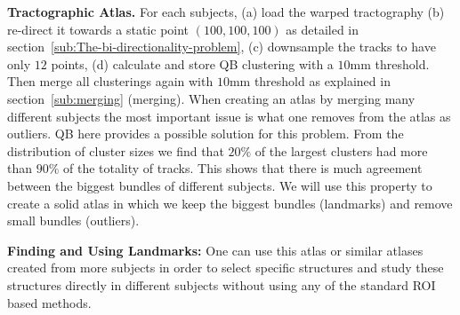 \documentclass[preprint,authoryear,a4paper,10pt,onecolumn]{elsarticle}
\begin{document}
\textbf{Tractographic Atlas.} For each subjects, (a) load the warped
tractography (b) re-direct it towards a static point $(100,100,100)$ as
detailed in section~\ref{sub:The-bi-directionality-problem}, (c)
downsample the tracks to have only $12$ points, (d) calculate and store
QB clustering with a $10$mm threshold. Then merge all clusterings again
with $10$mm threshold as explained in section~\ref{sub:merging}
(merging). When creating an atlas by merging many different subjects
the most important issue is what one removes from the atlas as
outliers. QB here provides a possible solution for this problem. From
the distribution of cluster sizes we find that $20\%$ of the largest
clusters had more than $90\%$ of the totality of tracks. This shows that
there is much agreement between the biggest bundles of different
subjects.  We will use this property to create a solid atlas in which we
keep the biggest bundles (landmarks) and remove small bundles
(outliers).

\textbf{Finding and Using Landmarks:} One can use this atlas or similar
atlases created from more subjects in order to select specific
structures and study these structures directly in different subjects
without using any of the standard ROI based methods.
\end{document}
